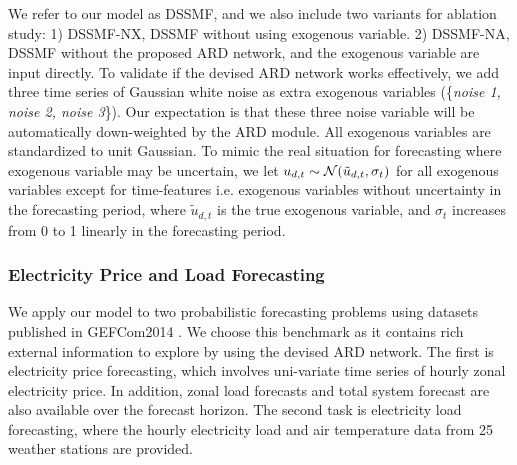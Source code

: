 \documentclass{article}
\begin{document}
We refer to our model as DSSMF, and we also include two variants for ablation study: 1) DSSMF-NX, DSSMF without using exogenous variable. 2) DSSMF-NA, DSSMF without the proposed ARD network, and the exogenous variable are input directly. To validate if the devised ARD network works effectively, we add three time series of Gaussian white noise as extra exogenous variables (\{\textit{noise 1, noise 2, noise 3}\}). Our expectation is that these three noise variable will be automatically down-weighted by the ARD module. All exogenous variables are standardized to unit Gaussian. To mimic the real situation for forecasting where exogenous variable may be uncertain, we let $u_{d,t}\sim \mathcal{N}(\tilde{u}_{d,t},\sigma_t)$ for all exogenous variables except for time-features i.e. exogenous variables without uncertainty in the forecasting period, where $\tilde{u}_{d,t}$ is the true exogenous variable, and $\sigma_t$ increases from 0 to 1 linearly in the forecasting period.

\subsubsection{Electricity Price and Load Forecasting}
We apply our model to two probabilistic forecasting problems using datasets published in GEFCom2014 \cite{hong2016probabilistic}. We choose this benchmark as it contains rich external information to explore by using the devised ARD network. The first is electricity price forecasting, which involves uni-variate time series of hourly zonal electricity price. In addition, zonal load forecasts and total system forecast are also available over the forecast horizon. The second task is electricity load forecasting, where the hourly electricity load and air temperature data from 25 weather stations are provided. 
\end{document}
